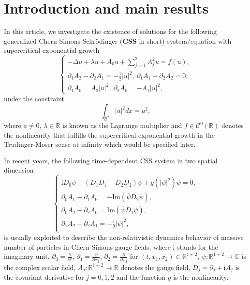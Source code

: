 \documentclass[11pt]{amsart}
\numberwithin{equation}{section}
\theoremstyle{definition}
\newcommand{\R}{\mathbb{R}}
\begin{document}
\begin{center}
	\begin{minipage}{8.5cm}
		\small
		\tableofcontents
	\end{minipage}
\end{center}

\smallskip

\section{Introduction and main results}


In this article, we investigate the existence of solutions for the following generalized Chern-Simons-Schr\"{o}dinger
(\textbf{CSS} in short) system/equation with supercritical exponential growth
\begin{equation}\label{mainequation1}
	\left\{
	\begin{array}{ll}
		\displaystyle    -\Delta u +\lambda u+A_0 u+\sum\limits_{j=1}^2A_j^2 u= f(u), \\
		\displaystyle     \partial_1A_2-\partial_2A_1=-\frac{1}{2}|u|^2,~\partial_1A_1+\partial_2A_2=0,\\
		\displaystyle    \partial_1A_0=A_2|u|^2,~ \partial_2A_0=-A_1|u|^2,
	\end{array}
	\right.
\end{equation}
under the constraint
\begin{equation}\label{mainequation1a}
	\int_{\R^2}|u|^2dx=a^2,
\end{equation}
where $a\neq0$, $\lambda\in\R$ is known as the Lagrange multiplier
and $f\in \mathcal{C}^0(\R)$ denotes the nonlinearity that fulfills the
supercritical exponential growth in the Trudinger-Moser sense at infinity which would be specified later.

In recent years, the following time-dependent CSS system in two spatial dimension
\begin{equation}\label{CSS1}
	\begin{cases}
		\text{i}D_0\psi+(D_1D_1+D_2D_2)\psi+g(|\psi|^2)\psi=0, \\
		\partial_0A_1-\partial_1A_0=-\text{Im}(\overline{\psi} D_2\psi),\\
		\partial_0A_2-\partial_2A_0=\text{Im}(\overline{\psi} D_1\psi), \\
		\partial_1A_2-\partial_2A_1=-\frac{1}{2}|\psi|^2 ,\\
	\end{cases}
\end{equation}
is usually exploited to describe the non-relativistic dynamics behavior
of massive number of particles in Chern-Simons gauge fields,
where i stands for the imaginary unit,
$\partial_0=\frac{\partial}{\partial t}$, $\partial_1=\frac{\partial}{\partial x_1}$, $\partial_2=\frac{\partial}{\partial x_2}$
for $(t,x_1,x_2)\in\R^{1+2}$, $\psi:\R^{1+2}\to \mathbb{C}$ is the complex scalar field,  $A_j:\R^{1+2}\to\R$ denotes the gauge field,
$D_j=\partial_j +\text{i}A_j$ is the covariant derivative for $j=0, 1, 2$
and the function $g$ is the nonlinearity.
\end{document}
